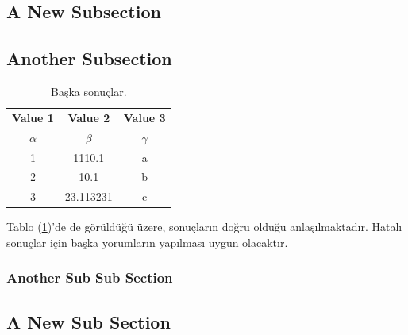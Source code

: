 \documentclass[english]{eqengconf}
\begin{document}
\blindtext

\subsection{A New Subsection}

\blindtext

\subsection{Another Subsection}

\blindtext

\begin{table}
	\setlength\abovecaptionskip{10pt}
	\setlength\belowcaptionskip{5pt}
	\vspace{-10pt}
	\centering
	\caption{\label{tab:baskasonuc}Başka sonuçlar.}
	\begin{tabular}{c|c|c} %
		\textbf{Value 1} & \textbf{Value 2} & \textbf{Value 3}\\
		$\alpha$ & $\beta$ & $\gamma$ \\
		\hline
		1 & 1110.1 & a\\
		2 & 10.1 & b\\
		3 & 23.113231 & c\\
	\end{tabular}
    \vspace{-10pt}
\end{table}

Tablo (\ref{tab:baskasonuc})'de de görüldüğü üzere, sonuçların doğru olduğu anlaşılmaktadır. Hatalı sonuçlar için başka yorumların yapılması uygun olacaktır.

\blindtext

\subsubsection{Another Sub Sub Section}
\blindtext

\blindtext

\subsection{A New Sub Section}
\blindtext

\blindtext
\end{document}
